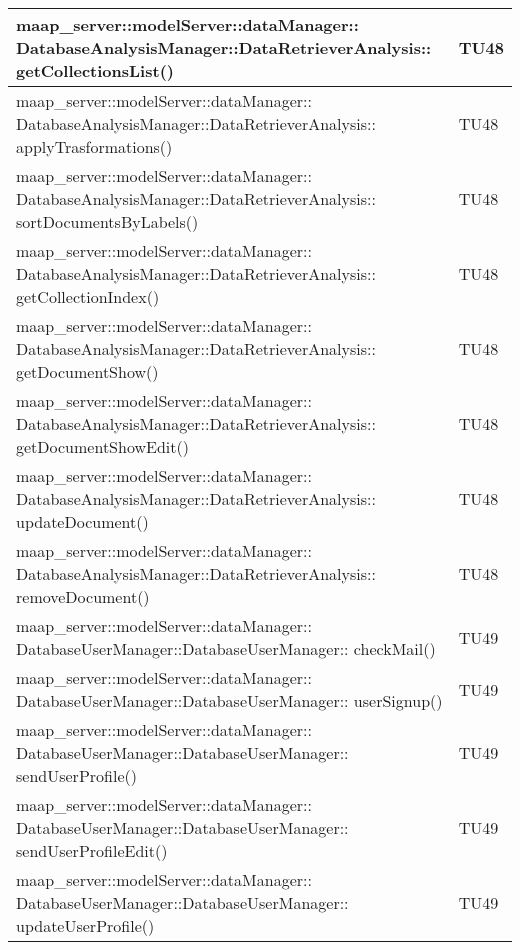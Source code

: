 \begin{center}
\begin{longtable}{|p{12cm}|p{2cm}|}
\midrule
maap\_server::modelServer::dataManager:: DatabaseAnalysisManager::DataRetrieverAnalysis:: getCollectionsList() & TU48\\

\midrule
maap\_server::modelServer::dataManager:: DatabaseAnalysisManager::DataRetrieverAnalysis:: applyTrasformations() & TU48\\

\midrule
maap\_server::modelServer::dataManager:: DatabaseAnalysisManager::DataRetrieverAnalysis:: sortDocumentsByLabels() & TU48\\

\midrule
maap\_server::modelServer::dataManager:: DatabaseAnalysisManager::DataRetrieverAnalysis:: getCollectionIndex() & TU48\\

\midrule
maap\_server::modelServer::dataManager:: DatabaseAnalysisManager::DataRetrieverAnalysis:: getDocumentShow() & TU48\\

\midrule
maap\_server::modelServer::dataManager:: DatabaseAnalysisManager::DataRetrieverAnalysis:: getDocumentShowEdit() & TU48\\

\midrule
maap\_server::modelServer::dataManager:: DatabaseAnalysisManager::DataRetrieverAnalysis:: updateDocument() & TU48\\

\midrule
maap\_server::modelServer::dataManager:: DatabaseAnalysisManager::DataRetrieverAnalysis:: removeDocument() & TU48\\


\midrule
maap\_server::modelServer::dataManager:: DatabaseUserManager::DatabaseUserManager:: checkMail() & TU49\\

\midrule
maap\_server::modelServer::dataManager:: DatabaseUserManager::DatabaseUserManager:: userSignup() & TU49\\

\midrule
maap\_server::modelServer::dataManager:: DatabaseUserManager::DatabaseUserManager:: sendUserProfile() & TU49\\

\midrule
maap\_server::modelServer::dataManager:: DatabaseUserManager::DatabaseUserManager:: sendUserProfileEdit() & TU49\\

\midrule
maap\_server::modelServer::dataManager:: DatabaseUserManager::DatabaseUserManager:: updateUserProfile() & TU49\\


\end{longtable}
\end{center}
